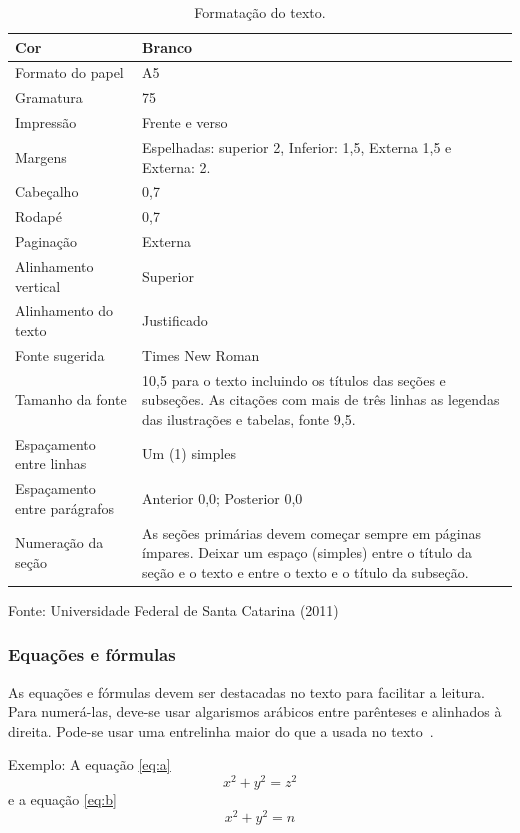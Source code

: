\documentclass{ufscThesis} %
\begin{document}
\begin{table}[!htb]
\begin{center}
 \caption{Formatação do texto.}\label{tab:a}
  \begin{tabular}{ p{3cm} | p{6cm} }
    \hline
Cor & Branco\\ \hline
Formato do papel & A5\\ \hline
Gramatura & 75\\ \hline
Impressão & Frente e verso\\ \hline
Margens & Espelhadas: superior 2, Inferior: 1,5, Externa 1,5 e Externa: 2.\\ \hline
Cabeçalho & 0,7\\ \hline
Rodapé & 0,7\\ \hline
Paginação & Externa\\ \hline
Alinhamento vertical & Superior\\ \hline
Alinhamento do texto & Justificado\\ \hline
Fonte sugerida & Times New Roman \\ \hline
Tamanho da fonte & 10,5 para o texto incluindo os títulos das seções e subseções. As citações com mais de três linhas as legendas das ilustrações e tabelas, fonte 9,5.\\ \hline
Espaçamento entre linhas & Um (1) simples\\ \hline
Espaçamento entre parágrafos & Anterior 0,0; Posterior 0,0\\ \hline
Numeração da seção & As seções  primárias devem  começar  sempre em páginas ímpares. Deixar um espaço (simples) entre o título da seção e o texto e  entre o texto e o título da subseção. \\  \hline
  \end{tabular}
\end{center}
Fonte: Universidade Federal de Santa Catarina (2011)
\end{table}



\subsubsection{Equações e fórmulas}

As equações e fórmulas devem ser destacadas no texto para facilitar a leitura.  Para numerá-las, deve-se usar algarismos arábicos entre parênteses e alinhados à direita. Pode-se usar uma entrelinha maior do que a usada no texto~\cite{abnt14724}.

Exemplo: A equação \ref{eq:a}
\begin{equation}
 x^2 + y^2 = z^2
 \label{eq:a}
\end{equation}
 e a equação  \ref{eq:b}
\begin{equation}
 x^2 + y^2 = n
\label{eq:b}
\end{equation}
\end{document}
